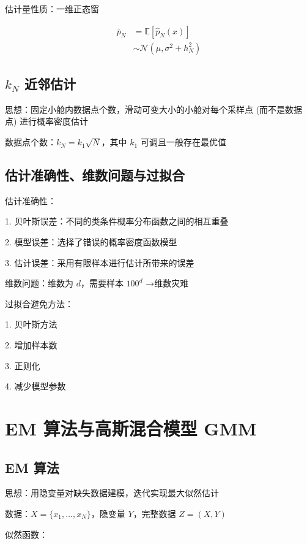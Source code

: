 \documentclass[openany,a4paper,12pt]{ctexbook}
\theoremstyle{kaiti}
\theoremstyle{normal}
\begin{document}
估计量性质：一维正态窗

\begin{equation}
\begin{aligned}
  \bar{p}_N
  &=\mathbb{E} \left[\hat{p}_N(x)\right] \\
  &\sim \mathcal{N} \left(\mu ,\sigma^2+h_{N}^{2} \right)
\end{aligned}
\end{equation}

\section{\texorpdfstring{$k_N$}{kN} 近邻估计}

思想：固定小舱内数据点个数，滑动可变大小的小舱对每个采样点 (而不是数据点) 进行概率密度估计

数据点个数：$k_N=k_1\sqrt{N}$，其中 $k_1$ 可调且一般存在最优值

\section{估计准确性、维数问题与过拟合}

估计准确性：

1. 贝叶斯误差：不同的类条件概率分布函数之间的相互重叠

2. 模型误差：选择了错误的概率密度函数模型

3. 估计误差：采用有限样本进行估计所带来的误差

维数问题：维数为 $d$，需要样本 $100^d$ →维数灾难

过拟合避免方法：

1. 贝叶斯方法

2. 增加样本数

3. 正则化

4. 减少模型参数

\chapter{EM 算法与高斯混合模型 GMM}

\section{EM 算法}

思想：用隐变量对缺失数据建模，迭代实现最大似然估计

数据：$X=\{ x_1,\dots,x_N\}$，隐变量 $Y$，完整数据 $Z=\left(X,Y \right)$

似然函数：
\end{document}
